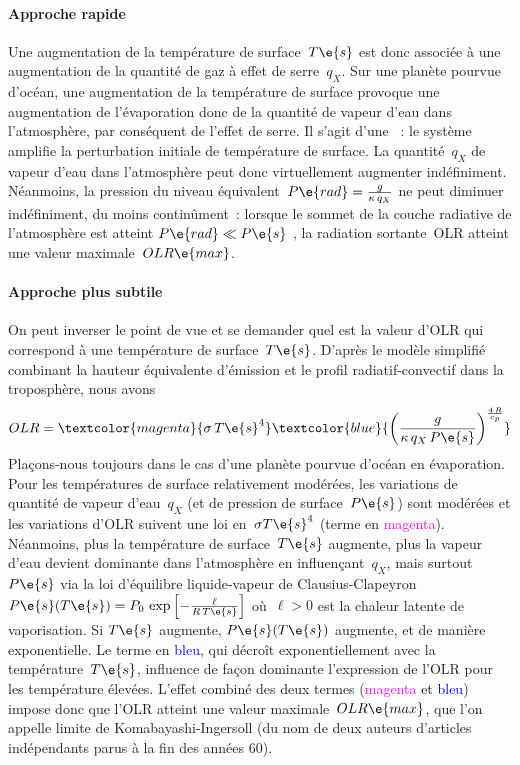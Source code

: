 

\sk
\paragraph{Approche rapide} Une augmentation de la température de surface~$T\e{s}$ 
est donc associée à une augmentation de la quantité de gaz à effet de serre~$q_X$.
Sur une planète pourvue d'océan,
une augmentation de la température de surface
provoque une augmentation de l'évaporation
donc de la quantité de vapeur d'eau dans l'atmosphère, 
par conséquent de l'effet de serre.
Il s'agit d'une ~:
le système amplifie la perturbation initiale de température de surface.
La quantité~$q_X$ de vapeur d'eau dans l'atmosphère
peut donc virtuellement augmenter indéfiniment.
Néanmoins, la pression du niveau équivalent~$P\e{rad} = \frac{g}{\kappa \, q_X}$
ne peut diminuer indéfiniment, du moins continûment~:
lorsque le sommet de la couche radiative de l'atmosphère
est atteint $P\e{rad} \ll P\e{s}$ , la radiation sortante~OLR
atteint une valeur maximale~$OLR\e{max}$.

\sk
\paragraph{Approche plus subtile} On peut inverser le point de vue et se demander quel est la valeur
d'OLR qui correspond à une température de surface~$T\e{s}$.
D'après le modèle simplifié combinant la hauteur équivalente
d'émission et le profil radiatif-convectif dans la troposphère, nous avons
\[ OLR  = \textcolor{magenta}{\sigma \, T\e{s}^4} \textcolor{blue}{\left( \frac{g}{\kappa \, q_X \, P\e{s}} \right)^{\frac{4 \, R}{c_p}}} \]
Plaçons-nous toujours dans le cas d'une planète pourvue
d'océan en évaporation.
Pour les températures de surface relativement modérées,
les variations de quantité de vapeur d'eau~$q_X$
(et de pression de surface~$P\e{s}$)
sont modérées et les variations d'OLR suivent 
une loi en~$\sigma T\e{s}^4$ (terme en \textcolor{magenta}{magenta}).
Néanmoins, plus la température de surface~$T\e{s}$
augmente, plus la vapeur d'eau devient dominante
dans l'atmosphère en influençant~$q_X$, mais
surtout~$P\e{s}$ via la loi d'équilibre liquide-vapeur
de Clausius-Clapeyron
$  P\e{s}(T\e{s}) = P_0 \, \exp{ \left[ -\frac{\ell}{R\,T\e{s}} \right] } $
\noindent où~$\ell > 0$ est la chaleur latente de vaporisation.
Si $T\e{s}$ augmente, $P\e{s}(T\e{s})$ augmente, et de manière exponentielle.
Le terme en \textcolor{blue}{bleu}, qui décroît exponentiellement avec
la température~$T\e{s}$, influence de façon dominante
l'expression de l'OLR pour les température élevées.
L'effet combiné des deux termes 
(\textcolor{magenta}{magenta} et \textcolor{blue}{bleu})
impose donc que l'OLR atteint une valeur maximale~$OLR\e{max}$,
que l'on appelle limite de Komabayashi-Ingersoll
(du nom de deux auteurs d'articles indépendants parus à la fin des années 60).

